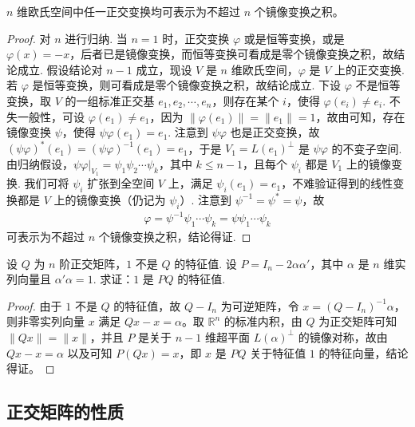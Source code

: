 \documentclass[../../main.tex]{subfiles}%
\begin{document}
\begin{proposition}\label{proposition:例9.43}
\(n\) 维欧氏空间中任一正交变换均可表示为不超过 \(n\) 个镜像变换之积。
\end{proposition}
\begin{proof}
对 \(n\) 进行归纳. 当 \(n = 1\) 时，正交变换 \(\varphi\) 或是恒等变换，或是 \(\varphi(x) = -x\)，后者已是镜像变换，而恒等变换可看成是零个镜像变换之积，故结论成立. 假设结论对 \(n - 1\) 成立，现设 \(V\) 是 \(n\) 维欧氏空间，\(\varphi\) 是 \(V\) 上的正交变换. 若 \(\varphi\) 是恒等变换，则可看成是零个镜像变换之积，故结论成立. 下设 \(\varphi\) 不是恒等变换，取 \(V\) 的一组标准正交基 \(e_1,e_2,\cdots,e_n\)，则存在某个 \(i\)，使得 \(\varphi(e_i) \neq e_i\). 不失一般性，可设 \(\varphi(e_1) \neq e_1\)，因为 \(\|\varphi(e_1)\| = \|e_1\| = 1\)，故由可知，存在镜像变换 \(\psi\)，使得 \(\psi\varphi(e_1) = e_1\). 注意到 \(\psi\varphi\) 也是正交变换，故 \((\psi\varphi)^*(e_1) = (\psi\varphi)^{-1}(e_1) = e_1\)，于是 \(V_1 = L(e_1)^{\perp}\) 是 \(\psi\varphi\) 的不变子空间. 由归纳假设，\(\psi\varphi|_{V_1} = \psi_1\psi_2\cdots\psi_k\)，其中 \(k \leqslant  n - 1\)，且每个 \(\psi_i\) 都是 \(V_1\) 上的镜像变换. 我们可将 \(\psi_i\) 扩张到全空间 \(V\) 上，满足 \(\psi_i(e_1) = e_1\)，不难验证得到的线性变换都是 \(V\) 上的镜像变换（仍记为 \(\psi_i\)）. 注意到 \(\psi^{-1} = \psi^* = \psi\)，故
\begin{align*}
\varphi = \psi^{-1}\psi_1\cdots\psi_k = \psi\psi_1\cdots\psi_k
\end{align*}
可表示为不超过 \(n\) 个镜像变换之积，结论得证. 
\end{proof}

\begin{proposition}\label{proposition:例9.44}
设 \(Q\) 为 \(n\) 阶正交矩阵，\(1\) 不是 \(Q\) 的特征值. 设 \(P = I_n - 2\alpha\alpha'\)，其中 \(\alpha\) 是 \(n\) 维实列向量且 \(\alpha'\alpha = 1\). 求证：\(1\) 是 \(PQ\) 的特征值.
\end{proposition}
\begin{proof}
由于 \(1\) 不是 \(Q\) 的特征值，故 \(Q - I_n\) 为可逆矩阵，令 \(x = (Q - I_n)^{-1}\alpha\)，则非零实列向量 \(x\) 满足 \(Qx - x = \alpha\)。取 \(\mathbb{R}^n\) 的标准内积，由 \(Q\) 为正交矩阵可知 \(\|Qx\| = \|x\|\)，并且 \(P\) 是关于 \(n - 1\) 维超平面 \(L(\alpha)^{\perp}\) 的镜像对称，故由 \(Qx - x = \alpha\) 以及可知 \(P(Qx) = x\)，即 \(x\) 是 \(PQ\) 关于特征值 \(1\) 的特征向量，结论得证。
\end{proof}


\subsection{正交矩阵的性质}
\end{document}
